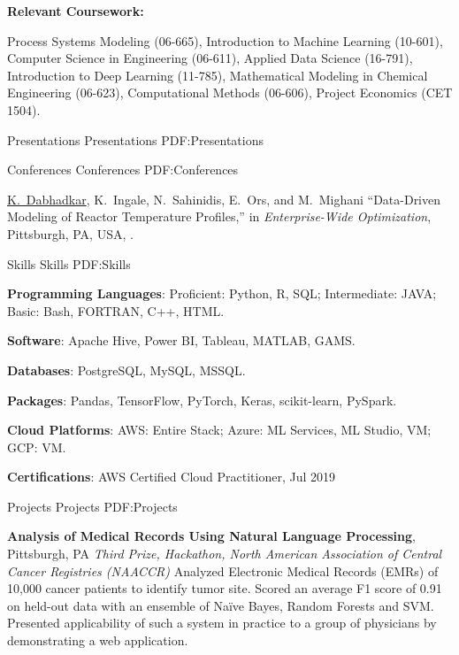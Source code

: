 \documentclass[letterpaper,MMMyyyy,nonstopmode]{simpleresumecv}
\begin{document}
\begin{Body}
\BigGap
\Entry
{\textbf{Relevant Coursework:}}

Process Systems Modeling (06-665), Introduction to Machine Learning (10-601), Computer Science in Engineering (06-611), Applied Data Science (16-791), Introduction to Deep Learning (11-785), Mathematical Modeling in Chemical Engineering (06-623), Computational Methods (06-606), Project Economics (CET 1504).

\newpage


\Section
{Presentations}
{Presentations}
{PDF:Presentations}

\SubSection
{Conferences}
{Conferences}
{PDF:Conferences}

\begingroup
\renewcommand{\MaxNumberedItem}{[88]}

\BigGap
\NumberedItem{[1]}
{\underline{K.~Dabhadkar}, K.~Ingale, N.~Sahinidis, E.~Ors, and M.~Mighani
``Data-Driven Modeling of Reactor Temperature Profiles,''
in \textit{Enterprise-Wide Optimization},
Pittsburgh,
PA,
USA,
.}



\Section
{Skills}
{Skills}
{PDF:Skills}

\textbf{Programming Languages}: \newline
Proficient: Python, R, SQL;  Intermediate: JAVA;	Basic: Bash, FORTRAN, C++, HTML.

\textbf{Software}: Apache Hive, Power BI, Tableau, MATLAB, GAMS.

\textbf{Databases}: PostgreSQL, MySQL, MSSQL.

\textbf{Packages}: Pandas, TensorFlow, PyTorch, Keras, scikit-learn, PySpark.

\textbf{Cloud Platforms}: AWS: Entire Stack; Azure: ML Services, ML Studio, VM; GCP: VM.

\textbf{Certifications}: AWS Certified Cloud Practitioner, Jul 2019


\Section
{Projects}
{Projects}
{PDF:Projects}


\Entry
{\textbf{Analysis of Medical Records Using Natural Language Processing}},
Pittsburgh, PA
\hfill
{}
\Entry
\textit{Third Prize, Hackathon, North American Association of Central Cancer Registries (NAACCR)}
\BulletItem
Analyzed Electronic Medical Records (EMRs) of 10,000 cancer patients to identify tumor site.
\BulletItem
Scored an average F1 score of 0.91 on held-out data with an ensemble of Naïve Bayes, Random Forests and SVM.
\BulletItem
Presented applicability of such a system in practice to a group of physicians by demonstrating a web application.


\end{Body}
\end{document}
